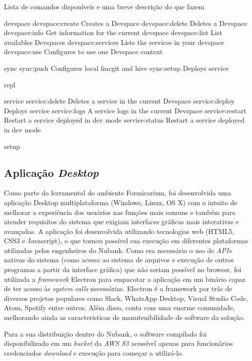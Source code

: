 Lista de comandos disponíveis e uma breve descrição do que fazem

devspace
  devspace:create    Creates a Devspace
  devspace:delete    Deletes a Devspace
  devspace:info      Get information for the current devspace
  devspace:list      List availables Devspaces
  devspace:services  Lists the services in your devspace
  devspace:use       Configures to use one Devspace context
  

sync
  sync:push   Configures local fmcgit and hive
  sync:setup  Deploys service

repl

service
  service:delete   Deletes a service in the current Devspace
  service:deploy   Deploys service
  service:logs     A service logs in the current Devspace
  service:restart  Restart a service deployed in dev mode
  service:status   Restart a service deployed in dev mode
  

setup




    \subsection{Aplicação \textit{Desktop}}

Como parte do ferramental do ambiente Formicarium, foi desenvolvida uma aplicação Desktop multiplataforma (Windows, Linux, OS X) com o intuito de melhorar a experiência dos usuários nas funções mais comuns e também para atender requisitos do sistema que exigiam interfaces gráficas mais interativas e avançadas. A aplicação foi desenvolvida utilizando tecnologias web (HTML5, CSS3 e Javascript), o que tornou possível sua execução em diferentes plataformas utilizadas pelos engenheiros do Nubank. Como era necessário o uso de \textit{APIs} nativas do sistema (como acesso ao sistema de arquivos e execução de outros programas a partir da interface gráfica) que não seriam possível no browser, foi utilizada a \textit{framework} Electron para empacotar a aplicação em um binário capaz de ter acesso às \textit{system calls} necessárias. Electron é a framework por trás de diversos projetos populares como Slack, WhatsApp Desktop, Visual Studio Code, Atom, Spotify entre outros. Além disso, conta com uma enorme comunidade, melhorando ainda as características de manutenibilidade de software da solução.

Para a sua distribuição dentro do Nubank, o software compilado foi disponibilizado em um \textit{bucket} da \textit{AWS S3} acessível apenas para funcionários credenciados \textit{download} e execução para começar a utilizá-lo.

